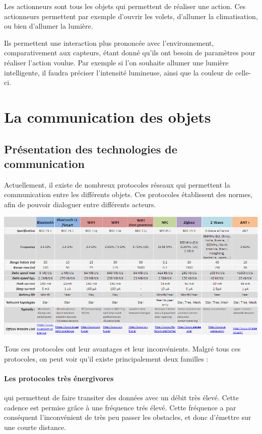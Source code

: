 Les actionneurs sont tous les objets qui permettent de réaliser une action. Ces actionneurs permettent par 
exemple d'ouvrir les volets, d'allumer la climatisation, ou bien d'allumer la lumière.

Ils permettent une interaction plus prononcée avec l'environnement, comparativement aux capteurs, étant donné 
qu'ils ont besoin de paramètres pour réaliser l'action voulue. Par exemple si l'on souhaite allumer une 
lumière intelligente, il faudra préciser l'intensité lumineuse, ainsi que la couleur de celle-ci.

\section{La communication des objets}
	\subsection{Présentation des technologies de communication}
Actuellement, il existe de nombreux protocoles réseaux qui permettent la communication entre les différents 
objets. Ces protocoles établissent des normes, afin de pouvoir dialoguer entre différents acteurs.

\includegraphics{img/tableau-total.png} 

Tous ces protocoles ont leur avantages et leur inconvénients. Malgré tous ces protocoles, on peut voir qu'il 
existe principalement deux familles :

\paragraph{Les protocoles très énergivores}qui permettent de faire transiter des données avec un débit très 
élevé. Cette cadence est permise grâce à une fréquence trés élevé. Cette fréquence a par conséquent 
l'inconvénient de très peu passer les obstacles, et donc d'émettre sur une courte distance.

